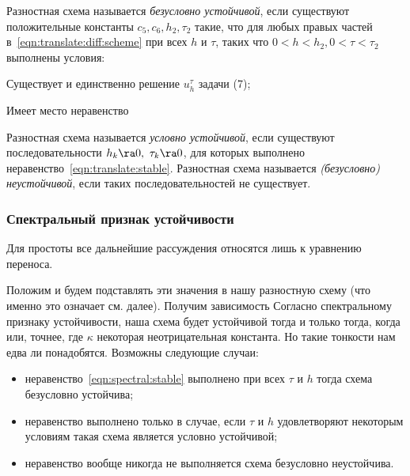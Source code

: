 \documentclass[a4paper]{article}
\begin{document}
\begin{df}
Разностная схема называется \emph{безусловно устойчивой}, если
существуют положительные константы $c_5, c_6, h_2, \tau_2$ такие, что
для любых правых частей в~\eqref{eqn:translate:diff:scheme} при всех
$h$ и $\tau$, таких что $0<h<h_2, 0<\tau<\tau_2$ выполнены условия:

\begin{nums}{-3}
\item Существует и единственно решение $u_h^{\tau}$ задачи (7);
\item Имеет место неравенство
\end{nums}
\end{df}

Разностная схема называется \emph{условно устойчивой}, если существуют
последовательности $h_k\ra0,\ \tau_k\ra0$, для которых выполнено
неравенство~\eqref{eqn:translate:stable}. Разностная схема называется
\emph{(безусловно) неустойчивой}, если таких последовательностей не
существует.

\subsubsection{Спектральный признак устойчивости}

Для простоты все дальнейшие рассуждения относятся лишь к уравнению
переноса.

Положим  и будем
подставлять эти значения в нашу разностную схему (что именно это
означает см. далее).  Получим зависимость  Согласно спектральному признаку устойчивости, наша схема
будет устойчивой тогда и только тогда, когда
 или, точнее,
\eqn{|\la|\le\kappa\tau,} где $\kappa$ некоторая неотрицательная
константа. Но такие тонкости нам едва ли понадобятся. Возможны
следующие случаи:
\begin{itemize}
  \item неравенство~\eqref{eqn:spectral:stable} выполнено при всех
    $\tau$ и $h$ тогда схема безусловно устойчива;
  \item неравенство выполнено только в случае, если $\tau$ и $h$
    удовлетворяют некоторым условиям такая схема является условно
    устойчивой;
  \item неравенство вообще никогда не выполняется схема безусловно
    неустойчива.
\end{itemize}
\end{document}
